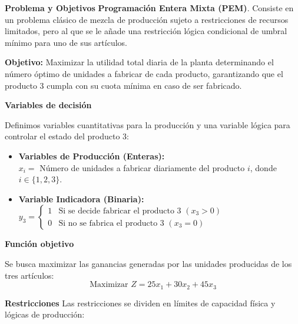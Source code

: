 \documentclass[10pt,a4paper]{article}
\begin{document}
\vspace{3mm}
\textbf{Problema y Objetivos}
\textbf{Programación Entera Mixta (PEM)}. Consiste en un problema clásico de mezcla de producción sujeto a restricciones de recursos limitados, pero al que se le añade una restricción lógica condicional de umbral mínimo para uno de sus artículos.

\textbf{Objetivo:} Maximizar la utilidad total diaria de la planta determinando el número óptimo de unidades a fabricar de cada producto, garantizando que el producto 3 cumpla con su cuota mínima en caso de ser fabricado.

\vspace{3mm}
\textbf{Variables de decisión}

Definimos variables cuantitativas para la producción y una variable lógica para controlar el estado del producto 3:

\begin{itemize}
    \item \textbf{Variables de Producción (Enteras):} \\
    $x_i = $ Número de unidades a fabricar diariamente del producto $i$, donde $i \in \{1, 2, 3\}$.
    
    \item \textbf{Variable Indicadora (Binaria):} \\
    $y_3 = 
    \begin{cases} 
    1 & \text{Si se decide fabricar el producto 3 } (x_3 > 0) \\
    0 & \text{Si no se fabrica el producto 3 } (x_3 = 0)
    \end{cases}$
\end{itemize}
\vspace{3mm}

\textbf{Función objetivo}

Se busca maximizar las ganancias generadas por las unidades producidas de los tres artículos:
\[ \text{Maximizar } Z = 25x_1 + 30x_2 + 45x_3 \]

\vspace{3mm}
\textbf{Restricciones}
Las restricciones se dividen en límites de capacidad física y lógicas de producción:
\end{document}

